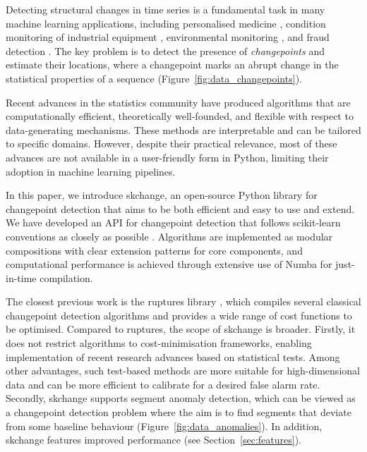 \documentclass[twoside,11pt]{article}
\begin{document}
Detecting structural changes in time series is a fundamental task in many machine learning applications, including personalised medicine \citep{li2026change}, condition monitoring of industrial equipment \citep{tveten2022scalable}, environmental monitoring \citep{gong2025changepoint}, and fraud detection \citep{rousseeuw2019robust}.
The key problem is to detect the presence of \emph{changepoints} and estimate their locations, where a changepoint marks an abrupt change in the statistical properties of a sequence (Figure~\ref{fig:data_changepoints}).

Recent advances in the statistics community have produced algorithms that are computationally efficient, theoretically well-founded, and flexible with respect to data-generating mechanisms. These methods are interpretable and can be tailored to specific domains. However, despite their practical relevance, most of these advances are not available in a user-friendly form in Python, limiting their adoption in machine learning pipelines.

In this paper, we introduce skchange, an open-source Python library for changepoint detection that aims to be both efficient and easy to use and extend.
We have developed an API for changepoint detection that follows scikit-learn conventions as closely as possible \citep{pedregosa2011scikit}.
Algorithms are implemented as modular compositions with clear extension patterns for core components, and computational performance is achieved through extensive use of Numba for just-in-time compilation.

The closest previous work is the ruptures library \citep{truong2020selective}, which compiles several classical changepoint detection algorithms and provides a wide range of cost functions to be optimised.
Compared to ruptures, the scope of skchange is broader. Firstly, it does not restrict algorithms to cost-minimisation frameworks, enabling implementation of recent research advances based on statistical tests.
Among other advantages, such test-based methods are more suitable for high-dimensional data and can be more efficient to calibrate for a desired false alarm rate.
Secondly, skchange supports segment anomaly detection, which can be viewed as a changepoint detection problem where the aim is to find segments that deviate from some baseline behaviour (Figure~\ref{fig:data_anomalies}).
In addition, skchange features improved performance (see Section~\ref{sec:features}).
\end{document}
